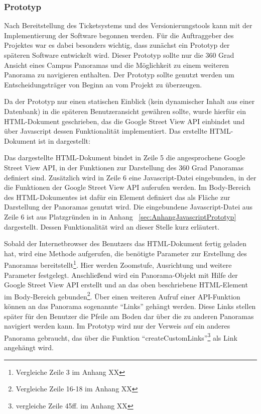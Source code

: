 \subsubsection{Prototyp}
\label{sec:Prototyp}

Nach Bereitstellung des Ticketsystems und des Versionierungstools kann mit der Implementierung der Software begonnen werden. Für die Auftraggeber des Projektes war es dabei besonders wichtig, dass zunächst ein Prototyp der späteren Software entwickelt wird. Dieser Prototyp sollte nur die 360 Grad Ansicht eines Campus Panoramas und die Möglichkeit zu einem weiteren Panorama zu navigieren enthalten. Der Prototyp sollte genutzt werden um Entscheidungsträger von Beginn an vom Projekt zu überzeugen.

Da der Prototyp nur einen statischen Einblick (kein dynamischer Inhalt aus einer Datenbank) in die späteren Benutzeransicht gewähren sollte, wurde hierfür ein HTML-Dokument geschrieben, das die Google Street View API einbindet und über Javascript dessen Funktionalität implementiert. Das erstellte HTML-Dokument ist in  dargestellt:



Das dargestellte HTML-Dokument bindet in Zeile 5 die angesprochene Google Street View API, in der Funktionen zur Darstellung des 360 Grad Panoramas definiert sind. Zusätzlich wird in Zeile 6 eine Javascript-Datei eingebunden, in der die Funktionen der Google Street View API auferufen werden. Im Body-Bereich des HTML-Dokumentes ist dafür ein Element definiert das als Fläche zur Darstellung der Panoramas genutzt wird. Die eingebundene Javascript-Datei aus Zeile 6 ist aus Platzgründen in  in Anhang ~\ref{sec:AnhangJavascriptPrototyp} dargestellt. Dessen Funktionalität wird an dieser Stelle kurz erläutert.

Sobald der Internetbrowser des Benutzers das HTML-Dokument fertig geladen hat, wird eine Methode aufgerufen, die benötigte Parameter zur Erstellung des Panoramas bereitstellt\footnote{Vergleiche Zeile 3 im Anhang XX}. Hier werden Zoomstufe, Ausrichtung und weitere Parameter festgelegt. Anschließend wird ein Panorama-Objekt mit Hilfe der Google Street View API erstellt und an das oben beschriebene HTML-Element im Body-Bereich gebunden\footnote{Vergleiche Zeile 16-18 im Anhang XX}. Über einen weiteren Aufruf einer API-Funktion können an das Panorama sogenannte "`Links"' gehängt werden. Diese Links stellen später für den Benutzer die Pfeile am Boden dar über die zu anderen Panoramas navigiert werden kann. Im Prototyp wird nur der Verweis auf ein anderes Panorama gebraucht, das über die Funktion "`createCustomLinks"'\footnote{vergleiche Zeile 45ff. im Anhang XX} als Link angehängt wird.

